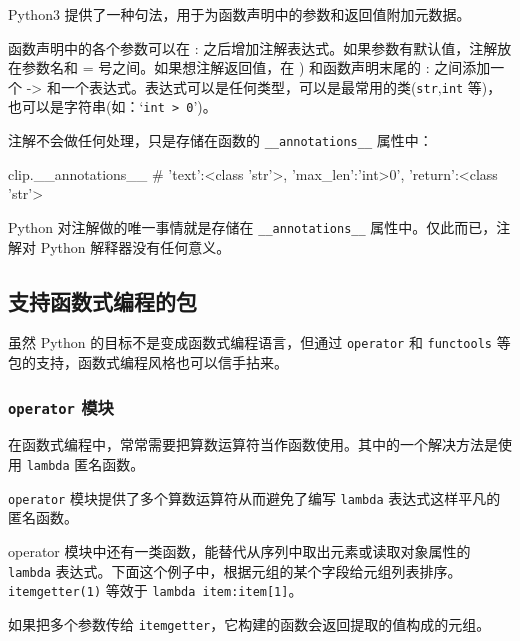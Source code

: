 Python3 提供了一种句法，用于为函数声明中的参数和返回值附加元数据。



函数声明中的各个参数可以在 : 之后增加注解表达式。如果参数有默认值，注解放在参数名和 = 号之间。如果想注解返回值，在 ) 和函数声明末尾的 : 之间添加一个 -> 和一个表达式。表达式可以是任何类型，可以是最常用的类(\texttt{str},\texttt{int} 等)，也可以是字符串(如：`\texttt{int > 0}')。

注解不会做任何处理，只是存储在函数的 \texttt{\_\_annotations\_\_} 属性中：
\begin{python}
clip.__annotations__
# {'text':<class 'str'>, 'max_len':'int>0', 'return':<class 'str'>}
\end{python}

Python 对注解做的唯一事情就是存储在 \texttt{\_\_annotations\_\_} 属性中。仅此而已，注解对 Python 解释器没有任何意义。

\subsection{支持函数式编程的包}

虽然 Python 的目标不是变成函数式编程语言，但通过 \texttt{operator} 和 \texttt{functools} 等包的支持，函数式编程风格也可以信手拈来。

\subsubsection{\texttt{operator} 模块}

在函数式编程中，常常需要把算数运算符当作函数使用。其中的一个解决方法是使用 \texttt{lambda} 匿名函数。



\texttt{operator} 模块提供了多个算数运算符从而避免了编写 \texttt{lambda} 表达式这样平凡的匿名函数。



operator 模块中还有一类函数，能替代从序列中取出元素或读取对象属性的 \texttt{lambda} 表达式。下面这个例子中，根据元组的某个字段给元组列表排序。\texttt{itemgetter(1)} 等效于 \texttt{lambda item:item[1]}。



如果把多个参数传给 \texttt{itemgetter}，它构建的函数会返回提取的值构成的元组。

